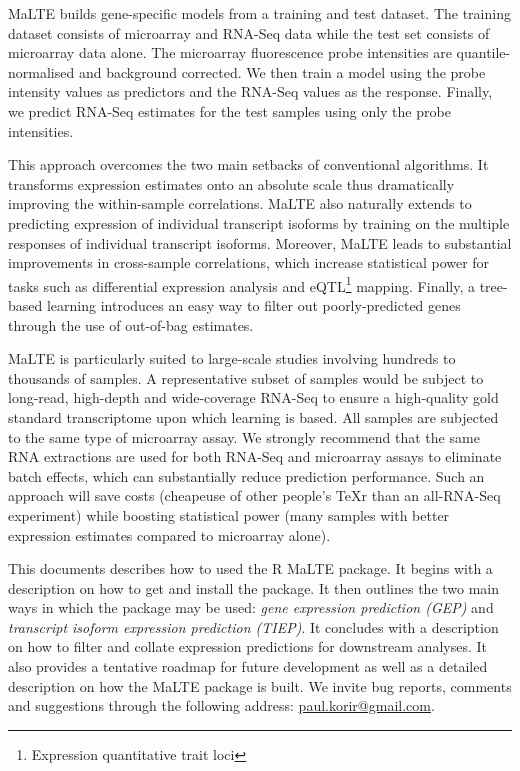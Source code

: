\documentclass[a4paper,12pt]{article}
\begin{document}
MaLTE builds gene-specific models from a training and test dataset. The training dataset consists of microarray and RNA-Seq data while the test set consists of microarray data alone. The microarray fluorescence probe intensities are quantile-normalised and background corrected. We then train a model using the probe intensity values as predictors and the RNA-Seq values as the response. Finally, we predict RNA-Seq estimates for the test samples using only the probe intensities.

This approach overcomes the two main setbacks of conventional algorithms. It transforms expression estimates onto an absolute scale thus dramatically improving the within-sample correlations. MaLTE also naturally extends to predicting expression of individual transcript isoforms by training on the multiple responses of individual transcript isoforms. Moreover, MaLTE leads to substantial improvements in cross-sample correlations, which increase statistical power for tasks such as differential expression analysis and eQTL\footnote{Expression quantitative trait loci} mapping. Finally, a tree-based learning introduces an easy way to filter out poorly-predicted genes through the use of out-of-bag estimates.

MaLTE is particularly suited to large-scale studies involving hundreds to thousands of samples. A representative subset of samples would be subject to long-read, high-depth and wide-coverage RNA-Seq to ensure a high-quality gold standard transcriptome upon which learning is based. All samples are subjected to the same type of microarray assay. We strongly recommend that the same RNA extractions are used for both RNA-Seq and microarray assays to eliminate batch effects, which can substantially reduce prediction performance. Such an approach will save costs (cheapeuse of other people's TeXr than an all-RNA-Seq experiment) while boosting statistical power (many samples with better expression estimates compared to microarray alone).

This documents describes how to used the \textsf{R} MaLTE package. It begins with a description on how to get and install the package. It then outlines the two main ways in which the package may be used: \textit{gene expression prediction (GEP)} and \textit{transcript isoform expression prediction (TIEP)}. It concludes with a description on how to filter and collate expression predictions for downstream analyses. It also provides a tentative roadmap for future development as well as a detailed description on how the MaLTE package is built. We invite bug reports, comments and suggestions through the following address: \href{mailto:paul.korir@gmail.com}{paul.korir@gmail.com}.
\end{document}

